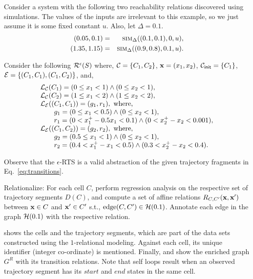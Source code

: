 \begin{example}
Consider a system with the following two reachability relations
discovered using simulations. The values of the inputs are irrelevant
to this example, so we just assume it is some fixed constant $u$.
Also, let $\Delta = 0.1$.
\begin{eqnarray}
\label{eq:transitions}
(0.05, 0.1) & = & \mbox{\sc sim}_\Delta((0.1, 0.1), 0, u), \\
(1.35,1.15) & = & \mbox{\sc sim}_\Delta((0.9, 0.8), 0.1, u).
\end{eqnarray}

Consider the following $\mathcal{R}^{\epsilon}(S)$ where,
$\mathcal{C} = \{C_1,C_2\}$, $\mathbf{x} = (x_1,x_2)$, $\mathcal{C}_{\mathsf{init}} = \{C_1\}$,
$\mathcal{E} = \{(C_1,C_1), (C_1, C_2)\}$, and,
\[
\begin{array}{l}
\mathcal{L}_\mathcal{C}(C_1) = (0 \le x_1 < 1) \wedge (0 \le x_2 < 1), \\
\mathcal{L}_\mathcal{C}(C_2) = (1 \le x_1 < 2) \wedge (1 \le x_2 < 2), \\
\mathcal{L}_\mathcal{E}((C_1,C_1)) = (g_1,r_1), \text{ where, } \\
\qquad g_1 = (0 \le x_1 < 0.5) \wedge (0 \le x_2 < 1), \\
\qquad r_1 = (0 < x^+_1 - 0.5x_1 < 0.1) \wedge (0 < x^+_2 - x_2 < 0.001), \\
\mathcal{L}_\mathcal{E}((C_1,C_2)) = (g_2,r_2), \text{ where, } \\
\qquad g_2 = (0.5 \le x_1 < 1) \wedge (0 \le x_2 < 1), \\
\qquad r_2 = (0.4 < x^+_1 - x_1 < 0.5) \wedge (0.3 < x^+_2 - x_2 < 0.4). \\
\end{array}
\]

Observe that the $\epsilon$-RTS is a valid abstraction of the given
trajectory fragments in Eq.~\ref{eq:transitions}.
\end{example}

\begin{example} Relationalize: For each cell $C$, perform regression
    analysis on the respective set of trajectory segments $D(C)$, and
    compute a set of affine relations $R_{C,C'}(\mathbf{x},\mathbf{x}')$ between $\mathbf{x}
    \in C$ and $\mathbf{x}' \in C'$ s.t., $\text{edge} (C,C') \in
    \mathcal{H}(0.1)$. Annotate each edge in the graph $\mathcal{H}(0.1)$ with
    the respective relation.

     shows the cells and the trajectory segments, which
    are part of the data sets constructed using the $1$-relational
    modeling. Against each cell, its unique identifier (integer
    co-ordinate) is mentioned.  Finally,  and
     show the enriched graph $G^R$ with its transition
    relations. Note that self loops result when an observed trajectory
    segment has its $start$ and $end$ states in the same cell.
\end{example}


